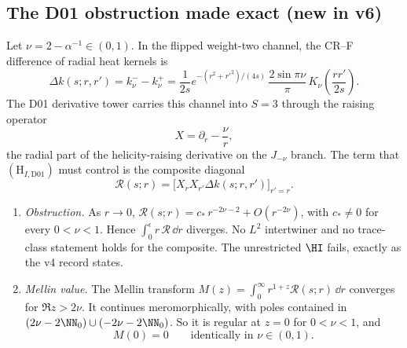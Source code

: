 \subsection{The D01 obstruction made exact (new in v6)}
\label{sec:HI}

Let \(\nu=2-\alpha^{-1}\in(0,1)\).
In the flipped weight-two channel, the CR--F difference of radial
heat kernels is
\[
\Delta k(s;r,r')=k^-_\nu-k^+_\nu
=\frac{1}{2s}e^{-(r^2+r'^2)/(4s)}\,
\frac{2\sin\pi\nu}{\pi}\,K_\nu\!\left(\frac{rr'}{2s}\right).
\]
The D01 derivative tower carries this channel into \(S=3\) through
the raising operator
\[
X=\partial_r-\frac{\nu}{r},
\]
the radial part of the helicity-raising derivative on the
\(J_{-\nu}\) branch.
The term that \((\mathrm H_{I,\mathrm{D01}})\) must control is the
composite diagonal
\[
\mathcal R(s;r)=\bigl[X_rX_{r'}\Delta k(s;r,r')\bigr]_{r'=r}.
\]

\begin{theorem}
\label{thm:HI}
\leavevmode
\begin{enumerate}[label=\textup{(\roman*)}]
\item \emph{Obstruction.}
As \(r\to0\), \(\mathcal R(s;r)=c_*\,r^{-2\nu-2}+O(r^{-2\nu})\),
with \(c_*\neq0\) for every \(0<\nu<1\).
Hence \(\int_0^\epsilon r\,\mathcal R\,\dd r\) diverges.
No \(L^2\) intertwiner and no trace-class statement holds for the
composite. The unrestricted \(\HI\) fails, exactly as the v4 record
states.

\item \emph{Mellin value.}
The Mellin transform
\(M(z)=\int_0^\infty r^{1+z}\mathcal R(s;r)\,\dd r\)
converges for \(\Re z>2\nu\).
It continues meromorphically, with poles contained in
\((2\nu-2\NN_0)\cup(-2\nu-2\NN_0)\).
So it is regular at \(z=0\) for \(0<\nu<1\), and
\[
M(0)=0\qquad\text{identically in }\nu\in(0,1).
\]
\end{enumerate}
\end{theorem}

